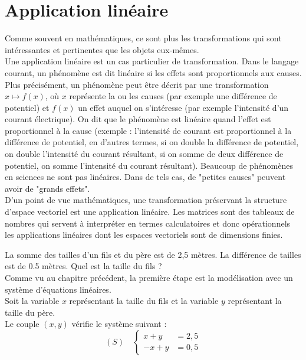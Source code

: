 \documentclass{book}
\begin{document}
\chapter*{Application linéaire}


\begin{Texte}
Comme souvent en mathématiques, ce sont plus les transformations qui sont intéressantes et pertinentes que les objets eux-mêmes.\\
Une application linéaire est un cas particulier de transformation.  Dans le langage courant, un phénomène est dit linéaire si les
effets sont proportionnels aux causes. \\
Plus précisément, un phénomène peut être décrit par une transformation$x \mapsto f (x)$, où $x$ représente la ou les causes (par exemple une différence de
potentiel) et $f(x)$ un effet auquel on s'intéresse (par exemple l'intensité
d'un courant électrique). On dit que le phénomène est linéaire quand  l'effet est proportionnel à la cause (exemple : l'intensité de courant est
proportionnel à la différence de potentiel, en d'autres termes, si on double
la différence de potentiel, on double l'intensité du courant résultant, si on somme de deux différence de potentiel, on somme l'intensité du courant résultant).
Beaucoup de phénomènes en sciences ne sont pas linéaires. Dans de tels
cas, de "petites causes" peuvent avoir de "grands effets".\\
D'un point de vue mathématiques, une
transformation préservant la structure d'espace vectoriel est une application linéaire.  Les matrices sont des tableaux de nombres qui servent à interpréter en termes calculatoires et donc opérationnels les applications linéaires dont les espaces vectoriels sont de dimensions finies.\\ 
\begin{Exemple}
La somme des tailles d'un fils et du père est de 2,5 mètres. La différence de tailles  est de 0.5 mètres.
Quel est la taille du fils ? \\
Comme vu au chapitre précédent, la première étape est la modélisation avec un système d'équations linéaires.\\
Soit la variable $x$ représentant la taille du fils et la variable $y$ représentant la taille du père.\\
Le couple $(x,y)$ vérifie le système suivant  :
$$(S)\quad \begin{cases}
x+y&=2,5\\
-x+y&=0,5
\end{cases}
$$
\end{Exemple}
\end{Texte}
\end{document}
